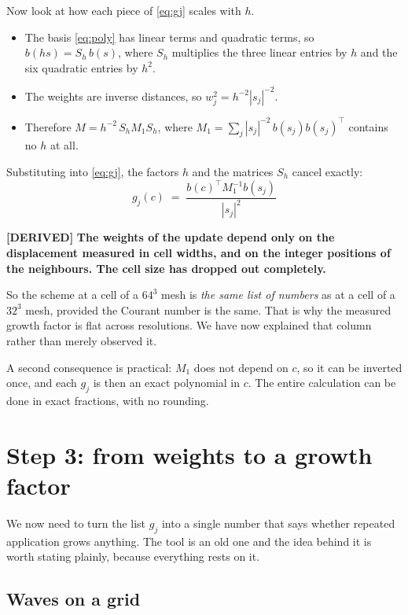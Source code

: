 \documentclass[11pt,a4paper]{article}
\newcommand{\derived}{\textcolor{blue!50!black}{\textbf{[DERIVED]}}}
\begin{document}
Now look at how each piece of \eqref{eq:gj} scales with $h$.

\begin{itemize}
\item The basis \eqref{eq:poly} has linear terms and quadratic terms, so
      $b(h s) = S_h\, b(s)$, where $S_h$ multiplies the three linear entries by $h$ and the
      six quadratic entries by $h^2$.
\item The weights are inverse distances, so $w_j^2 = h^{-2} |s_j|^{-2}$.
\item Therefore $M = h^{-2}\, S_h M_1 S_h$, where
      $M_1 = \sum_j |s_j|^{-2}\, b(s_j) b(s_j)^{\!\top}$ contains no $h$ at all.
\end{itemize}

Substituting into \eqref{eq:gj}, the factors $h$ and the matrices $S_h$ cancel exactly:
\begin{equation}
  \boxed{\;
  g_j(c) \;=\; \frac{b(c)^{\!\top} M_1^{-1} b(s_j)}{|s_j|^{2}} \;}
  \label{eq:gj-scaled}
\end{equation}

\derived{} \textbf{The weights of the update depend only on the displacement measured in cell
widths, and on the integer positions of the neighbours. The cell size has dropped out
completely.}

So the scheme at a cell of a $64^3$ mesh is \emph{the same list of numbers} as at a cell of a
$32^3$ mesh, provided the Courant number is the same. That is why the measured growth factor
is flat across resolutions. We have now explained that column rather than merely observed it.

A second consequence is practical: $M_1$ does not depend on $c$, so it can be inverted once,
and each $g_j$ is then an exact polynomial in $c$. The entire calculation can be done in
exact fractions, with no rounding.

\section{Step 3: from weights to a growth factor}
\label{sec:symbol}

We now need to turn the list $g_j$ into a single number that says whether repeated
application grows anything. The tool is an old one and the idea behind it is worth stating
plainly, because everything rests on it.

\subsection{Waves on a grid}
\end{document}
